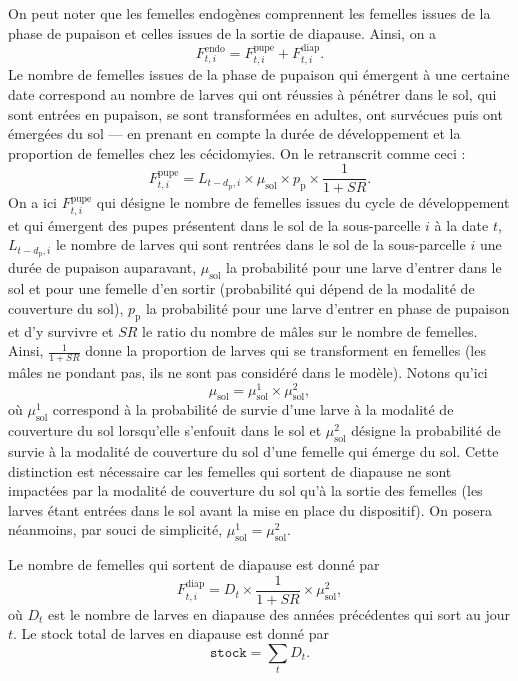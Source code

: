 On peut noter que les femelles endogènes comprennent les femelles issues de la phase de pupaison et celles issues de la sortie de diapause. Ainsi, on a
\[
F^{\text{endo}}_{t, i} = F^{\text{pupe}}_{t, i} + F^{\text{diap}}_{t,i}.
\]
Le nombre de femelles issues de la phase de pupaison qui émergent à une certaine date correspond au nombre de larves qui ont réussies à pénétrer dans le sol, qui sont entrées en pupaison, se sont transformées en adultes, ont survécues puis ont émergées du sol --- en prenant en compte la durée de développement et la proportion de femelles chez les cécidomyies.
On le retranscrit comme ceci :
\[
F^{\text{pupe}}_{t, i} = L_{t - d_{\text{p}}, i} \times \mu_{\text{sol}} \times p_{\text{p}} \times \frac{1}{1 + \mathit{SR}}.
\]
On a ici $F^{\text{pupe}}_{t, i}$ qui désigne le nombre de femelles issues du cycle de développement et qui émergent des pupes présentent dans le sol de la sous-parcelle $i$ à la date $t$, $L_{t - d_{\text{p}}, i}$ le nombre de larves qui sont rentrées dans le sol de la sous-parcelle $i$ une durée de pupaison auparavant, $\mu_{\text{sol}}$ la probabilité pour une larve d'entrer dans le sol et pour une femelle d'en sortir (probabilité qui dépend de la modalité de couverture du sol), $p_{\text{p}}$ la probabilité pour une larve d'entrer en phase de pupaison et d'y survivre et $\mathit{SR}$ le ratio du nombre de mâles sur le nombre de femelles. 
Ainsi, $\frac{1}{1 + \mathit{SR}}$ donne la proportion de larves qui se transforment en femelles (les mâles ne pondant pas, ils ne sont pas considéré dans le modèle).
Notons qu'ici
\[
\mu_{\text{sol}} = \mu_{\text{sol}}^1 \times \mu_{\text{sol}}^2,
\]
où $\mu_{\text{sol}}^1$ correspond à la probabilité de survie d'une larve à la modalité de couverture du sol lorsqu'elle s'enfouit dans le sol et $\mu_{\text{sol}}^2$ désigne la probabilité de survie à la modalité de couverture du sol d'une femelle qui émerge du sol.
Cette distinction est nécessaire car les femelles qui sortent de diapause ne sont impactées par la modalité de couverture du sol qu'à la sortie des femelles (les larves étant entrées dans le sol avant la mise en place du dispositif).
On posera néanmoins, par souci de simplicité, $\mu_{\text{sol}}^1 = \mu_{\text{sol}}^2$.

Le nombre de femelles qui sortent de diapause est donné par 
\[
F_{t, i}^{\text{diap}} = D_{t} \times \frac{1}{1 + \mathit{SR}} \times \mu^{2}_{\text{sol}},
\]
où $D_{t}$ est le nombre de larves en diapause des années précédentes qui sort au jour $t$.
Le stock total de larves en diapause est donné par
\[
\texttt{stock} = \sum_t D_t.
\]




